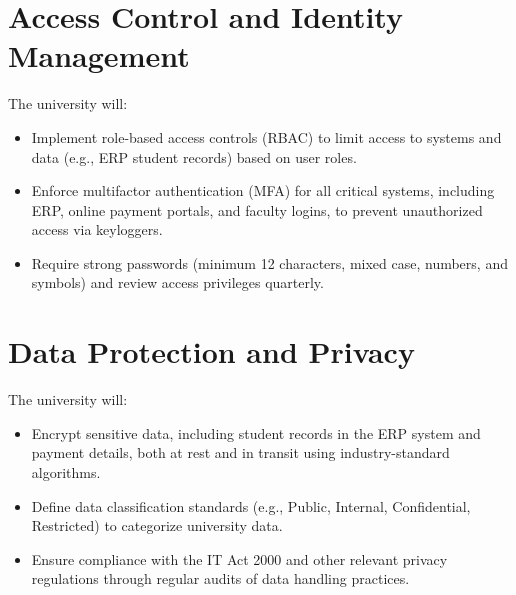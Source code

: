 \documentclass[11pt]{article}
\begin{document}
\section{Access Control and Identity Management}
The university will:
\begin{itemize}
    \item Implement role-based access controls (RBAC) to limit access to systems and data (e.g., ERP student records) based on user roles.
    \item Enforce multifactor authentication (MFA) for all critical systems, including ERP, online payment portals, and faculty logins, to prevent unauthorized access via keyloggers.
    \item Require strong passwords (minimum 12 characters, mixed case, numbers, and symbols) and review access privileges quarterly.
\end{itemize}

\section{Data Protection and Privacy}
The university will:
\begin{itemize}
    \item Encrypt sensitive data, including student records in the ERP system and payment details, both at rest and in transit using industry-standard algorithms.
    \item Define data classification standards (e.g., Public, Internal, Confidential, Restricted) to categorize university data.
    \item Ensure compliance with the IT Act 2000 and other relevant privacy regulations through regular audits of data handling practices.
\end{itemize}
\end{document}
